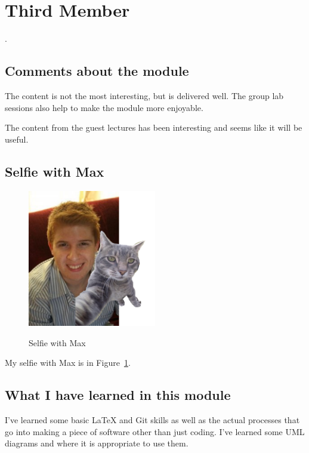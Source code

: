 \section{Third Member}. 

\subsection{Comments about the module}
The content is not the most interesting, but is delivered well. The group lab sessions also help to make the module more enjoyable.

The content from the guest lectures has been interesting and seems like it will be useful.

\subsection{Selfie with Max}

\begin{figure}[h]
\caption{Selfie with Max}
\centering
\includegraphics[width=0.5\textwidth]{picture1}
\label{fig:Max}
\end{figure}

 My selfie with Max is in  Figure~\ref{fig:Max}.

\subsection{What I have learned in this module}
I've learned some basic LaTeX and Git skills as well as the actual processes that go into making a piece of software other than just coding. I've learned some UML diagrams and where it is appropriate to use them.
